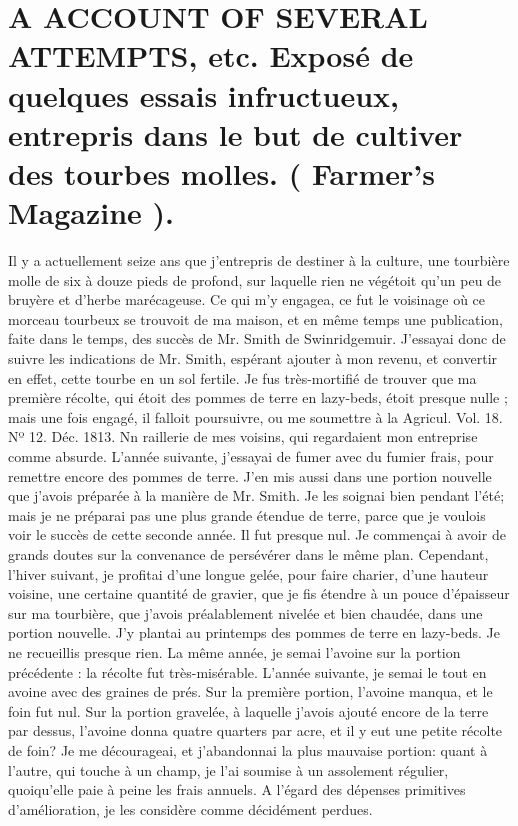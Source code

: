 \setcounter{page}{455}
\section{A ACCOUNT OF SEVERAL ATTEMPTS, etc. Exposé de quelques essais infructueux, entrepris dans le but de cultiver des tourbes molles. ( Farmer's Magazine ).}
Il y a actuellement seize ans que j'entrepris de destiner à la culture, une tourbière molle de six à douze pieds de profond, sur laquelle rien ne végétoit qu'un peu de bruyère et d'herbe marécageuse. Ce qui m'y engagea, ce fut le voisinage où ce morceau tourbeux se trouvoit de ma maison, et en même temps une publication, faite dans le temps, des succès de Mr. Smith de Swinridgemuir. J'essayai donc de suivre les indications de Mr. Smith, espérant ajouter à mon revenu, et convertir en effet, cette tourbe en un sol fertile. Je fus très-mortifié de trouver que ma première récolte, qui étoit des pommes de terre en lazy-beds, étoit presque nulle ; mais une fois engagé, il falloit poursuivre, ou me soumettre à la Agricul. Vol. 18. Nº 12. Déc. 1813. Nn\setcounter{page}{456} raillerie de mes voisins, qui regardaient mon entreprise comme absurde.
L'année suivante, j'essayai de fumer avec du fumier frais, pour remettre encore des pommes de terre. J'en mis aussi dans une portion nouvelle que j'avois préparée à la manière de Mr. Smith. Je les soignai bien pendant l'été; mais je ne préparai pas une plus grande étendue de terre, parce que je voulois voir le succès de cette seconde année. Il fut presque nul. Je commençai à avoir de grands doutes sur la convenance de persévérer dans le même plan. Cependant, l'hiver suivant, je profitai d'une longue gelée, pour faire charier, d'une hauteur voisine, une certaine quantité de gravier, que je fis étendre à un pouce d'épaisseur sur ma tourbière, que j'avois préalablement nivelée et bien chaudée, dans une portion nouvelle. J'y plantai au printemps des pommes de terre en lazy-beds. Je ne recueillis presque rien. La même année, je semai l'avoine sur la portion précédente : la récolte fut très-misérable. L'année suivante, je semai le tout en avoine avec des graines de prés. Sur la première portion, l'avoine manqua, et le foin fut nul. Sur la portion gravelée, à laquelle j'avois ajouté encore de la terre par dessus, l'avoine donna quatre quarters par\setcounter{page}{457} acre, et il y eut une petite récolte de foin? Je me décourageai, et j'abandonnai la plus mauvaise portion: quant à l'autre, qui touche à un champ, je l'ai soumise à un assolement régulier, quoiqu'elle paie à peine les frais annuels. A l'égard des dépenses primitives d'amélioration, je les considère comme décidément perdues.
